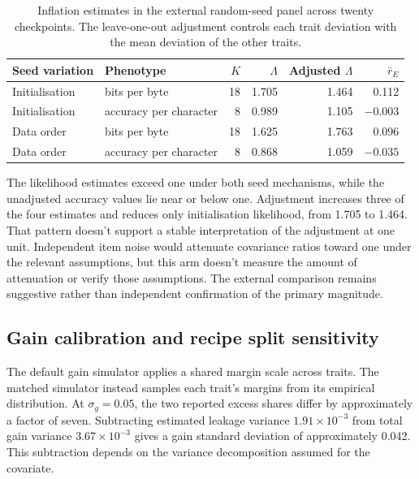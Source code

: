 \begin{table}[!htb]
\centering
\caption{Inflation estimates in the external random-seed panel across twenty checkpoints. The leave-one-out adjustment controls each trait deviation with the mean deviation of the other traits.}
\label{tab:original12}
\small\setlength{\tabcolsep}{4pt}\renewcommand{\arraystretch}{1.12}
\begin{tabular}{llrrrr}\toprule
Seed variation & Phenotype & $K$ & $\Lambda$ & Adjusted $\Lambda$ & $\bar r_E$\\\midrule
Initialisation & bits per byte & 18 & 1.705 & 1.464 & 0.112\\
Initialisation & accuracy per character & 8 & 0.989 & 1.105 & $-0.003$\\
Data order & bits per byte & 18 & 1.625 & 1.763 & 0.096\\
Data order & accuracy per character & 8 & 0.868 & 1.059 & $-0.035$\\\bottomrule
\end{tabular}
\end{table}

The likelihood estimates exceed one under both seed mechanisms, while the unadjusted accuracy values lie near or below one. Adjustment increases three of the four estimates and reduces only initialisation likelihood, from 1.705 to 1.464. That pattern doesn't support a stable interpretation of the adjustment at one unit. Independent item noise would attenuate covariance ratios toward one under the relevant assumptions, but this arm doesn't measure the amount of attenuation or verify those assumptions. The external comparison remains suggestive rather than independent confirmation of the primary magnitude.

\subsection{Gain calibration and recipe split sensitivity}
The default gain simulator applies a shared margin scale across traits. The matched simulator instead samples each trait's margins from its empirical distribution. At $\sigma_g=0.05$, the two reported excess shares differ by approximately a factor of seven. Subtracting estimated leakage variance $1.91\times10^{-3}$ from total gain variance $3.67\times10^{-3}$ gives a gain standard deviation of approximately 0.042. This subtraction depends on the variance decomposition assumed for the covariate.

